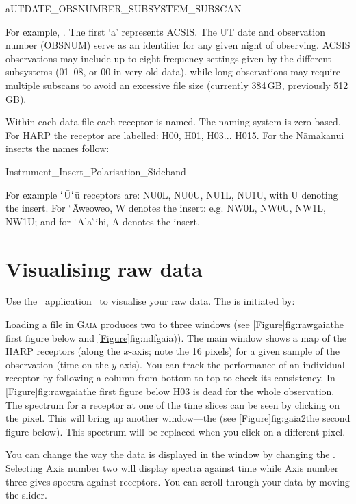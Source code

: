\documentclass[11pt,oneside,chapters]{starlink}
\begin{document}
aUTDATE\_OBSNUMBER\_SUBSYSTEM\_SUBSCAN

For example, . The first `a' represents
ACSIS. The UT date and observation number (OBSNUM) serve as an
identifier for any given night of observing. ACSIS observations may
include up to eight frequency settings given by the different
subsystems (01--08, or 00 in very old data), while long observations may require multiple
subscans to avoid an excessive file size
(currently 384\,GB, previously 512\,GB).

Within each data file each receptor is named. The naming system is
zero-based. For HARP the receptor are labelled: H00, H01, H03... H015.
For the N\=amakanui inserts the names follow:

Instrument\_Insert\_Polarisation\_Sideband

For example $`$\=U$`$\=u receptors are: NU0L, NU0U, NU1L, NU1U,
with U denoting the insert. For $`$\=Aweoweo, W denotes the insert:
e.g. NW0L, NW0U, NW1L, NW1U; and for $`$Ala$`$ihi, A denotes the insert.

\section{Visualising raw data}
\label{sec:exam}

Use the \starlink\ application \gaia\ to visualise your raw data. The
is initiated by:

\begin{terminalv}
\end{terminalv}

Loading a file in \textsc{Gaia} produces two to three windows (see
\cref{Figure}{fig:rawgaia}{the first figure below} and
\cref{Figure}{fig:ndfgaia})). The main window
shows a map of the HARP receptors (along the $x$-axis; note the 16
pixels) for a given sample of the observation (time on the $y$-axis).
You can track the performance of an individual receptor by following a
column from bottom to top to check its consistency. In
\cref{Figure}{fig:rawgaia}{the first figure below} H03 is dead for the
whole observation. The spectrum for a receptor at one of the time
slices can be seen by clicking on the pixel. This will bring up
another window---the  (see
\cref{Figure}{fig:gaia2}{the second figure below}). This spectrum will
be replaced when you click on a different pixel.

You can change the way the data is displayed in the  window by changing the .
Selecting Axis number two will display spectra against time while Axis
number three gives spectra against receptors. You can scroll through
your data by moving the  slider.
\end{document}
